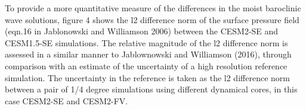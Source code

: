{\color{red}{Show results for wave evolution and L2 error norms}}
To provide a more quantitative measure of the differences in the moist baroclinic wave solutions, figure 4 shows the l2 difference norm of the surface pressure field (eqn.16 in Jablonowski and Williamson 2006) between the CESM2-SE and CESM1.5-SE simulations. The relative magnitude of the l2 difference norm is assessed in a similar manner to Jablownowski and Williamson (2016), through comparison with an estimate of the uncertainty of a high resolution reference simulation. The uncertainty in the reference is taken as the l2 difference norm between a pair of 1/4 degree simulations using different dynamical cores, in this case CESM2-SE and CESM2-FV.
